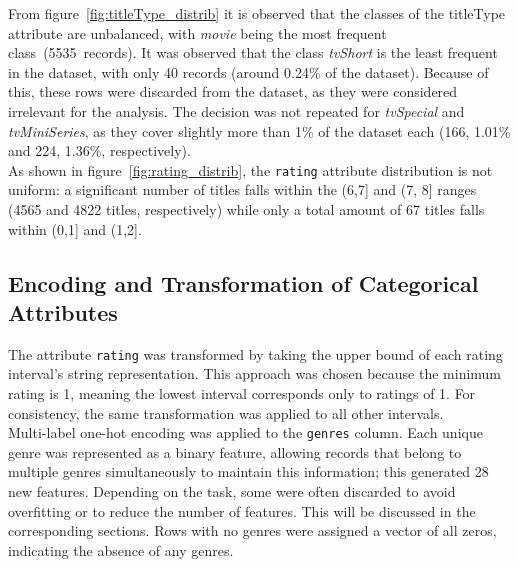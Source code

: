 From figure~\ref{fig:titleType_distrib} it is observed that the classes of the titleType attribute are unbalanced, with \textit{movie} being the most frequent class (5535 records).
It was observed that the class \textit{tvShort} is the least frequent in the dataset, with only 40 records (around 0.24\% of the dataset). Because of this, these rows were discarded from the dataset, as they were considered irrelevant for the analysis.
The decision was not repeated for \textit{tvSpecial} and \textit{tvMiniSeries}, as they cover slightly more than 1\% of the dataset each (166, 1.01\% and 224, 1.36\%, respectively). \\

As shown in figure~\ref{fig:rating_distrib}, the \texttt{rating} attribute distribution is not uniform: a significant number of titles falls within the (6,7] and (7, 8] ranges (4565 and 4822 titles, respectively) while only a total amount of 67 titles falls within (0,1] and (1,2]. \\


\subsection{Encoding and Transformation of Categorical Attributes}
The attribute \texttt{rating} was transformed by taking the upper bound of each rating
interval's string representation. This approach was chosen because the minimum rating is 1, meaning the
lowest interval corresponds only to ratings of 1. For consistency, the same transformation was applied
to all other intervals.\\

Multi-label one-hot encoding was applied to the \texttt{genres} column. 
Each unique genre was represented as a binary feature, allowing records that belong to multiple genres simultaneously to maintain this information; this generated 28 new features.
Depending on the task, some were often discarded to avoid overfitting or to reduce the number of features.
This will be discussed in the corresponding sections.
Rows with no genres were assigned a vector of all zeros, indicating the absence of any genres.\\

